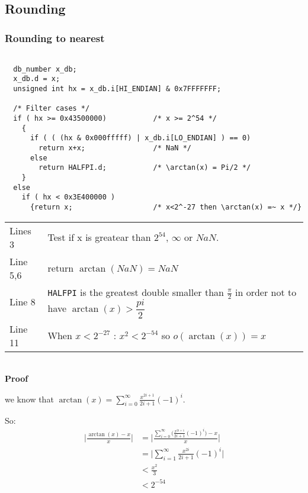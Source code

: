 \bigskip

\subsection{Rounding}
\subsubsection{Rounding to nearest}
\begin{lstlisting}[caption={Exceptional cases : rounding to nearest},firstnumber=1]

  db_number x_db;
  x_db.d = x;
  unsigned int hx = x_db.i[HI_ENDIAN] & 0x7FFFFFFF; 

  /* Filter cases */
  if ( hx >= 0x43500000)           /* x >= 2^54 */
    {
      if ( ( (hx & 0x000fffff) | x_db.i[LO_ENDIAN] ) == 0)
        return x+x;                /* NaN */
      else
        return HALFPI.d;           /* \arctan(x) = Pi/2 */
    }
  else
    if ( hx < 0x3E400000 )
      {return x;                   /* x<2^-27 then \arctan(x) =~ x */}

\end{lstlisting}
\begin{tabular}{ll}
Lines 3 & Test if x is greatear than $2^{54}$, $\infty$ or $NaN$. \\
Line 5,6 & return $\arctan(NaN) = NaN$\\
Line 8 & \texttt{HALFPI} is the greatest double smaller than
$\frac{\pi}{2}$ in order not to have $\arctan(x) > \dfrac{pi}{2}$ \\
Line 11 & When $x<2^{-27}$ : $x^2 < 2^{-54}$ so $o(\arctan(x)) = x$
\end{tabular}
\\

\textbf{Proof}

 we know that $\arctan(x) = \displaystyle {\sum_{i=0}^{\infty}
\frac{x^{2i+1}}{2i+1}(-1)^i}$.

So:
\begin{equation}
   \begin{split}
       \Big| \frac{\arctan(x)-x}{x}  \Big| & = 
       \Bigg|\frac{ \displaystyle {\sum_{i=0}^{\infty}
       \Big( \frac{x^{2i+1}}{2i+1}(-1)^i} \Big) - x}{x} \Bigg|
       \nonumber\\
       & = \Big|\displaystyle {\sum_{i=1}^{\infty}}
       \frac{x^{2i}}{2i+1}(-1)^i\Big|\nonumber \\ 
       & < \frac{x^2}{3}\nonumber \\
       & < 2^{-54} \nonumber
   \end{split}
\end{equation}

